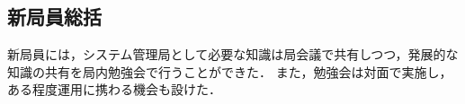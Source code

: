\subsection*{新局員総括}


新局員には，システム管理局として必要な知識は局会議で共有しつつ，発展的な知識の共有を局内勉強会で行うことができた．
また，勉強会は対面で実施し，ある程度運用に携わる機会も設けた．
